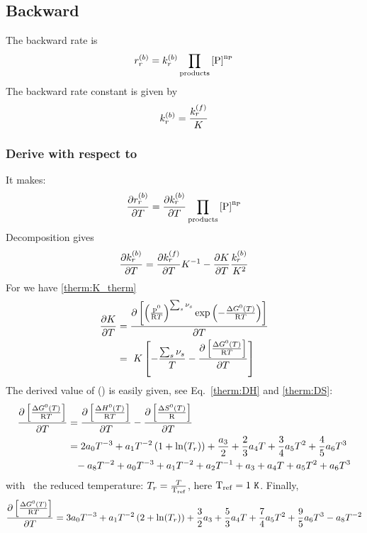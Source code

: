 \subsection{Backward}

The backward rate is
\begin{equation}
\bkwdrate[r] = \bkwdratecons[r]\prodProd
\end{equation}
The backward rate constant is given by
\begin{equation}
\bkwdratecons[r] = \frac{\fwdratecons[r]}{\Eqconst}
\end{equation}

\subsubsection{Derive with respect to \Temp}
It makes:
\begin{equation}
\doverdT{\bkwdrate[r]} = \doverdT{\bkwdratecons[r]}\prodProd
\end{equation}
Decomposition gives
\begin{equation}
\doverdT{\bkwdratecons[r]} = \doverdT{\fwdratecons[r]}\Eqconst^{-1} - \doverdT{\Eqconst}\frac{\bkwdratecons[r]}{\Eqconst^{2}}
\label{rateb-decomp}
\end{equation}
For \Eqconst we have \eqref{therm:K_therm}
\begin{equation}
\begin{split}
\doverdT{\Eqconst} & = \doverdT{\left[\left(\frac{\pz}{\Rg \Temp}\right)^{\sum_s \scoef[s]} \exp\left(-\frac{\DGibbsZ(\Temp)}{\Rg \Temp}\right)\right]} \\
                   & = \Eqconst\left[-\frac{\sum_s\scoef[s]}{\Temp} - \doverdT{\left[\frac{\DGibbsZ(\Temp)}{\Rg \Temp}\right]}\right]
\end{split}
\end{equation}
The derived value of \DGibbsZ(\Temp) is easily given, 
see Eq.~\ref{therm:DH} and \ref{therm:DS}:
\begin{equation}
\begin{split}
\doverdT{\left[\frac{\DGibbsZ(\Temp)}{\Rg \Temp}\right]} 
        & = \doverdT{\left[\frac{\DenthZ(T)}{\Rg \Temp}\right]} - \doverdT{\left[\frac{\DentrZ(\Temp)}{\Rg}\right]} \\
        & = 2\tc{0}\Temp^{-3} + \tc{1}\Temp^{-2}\left(1+\ln(\RedTemp)\right) + \frac{\tc{3}}{2} + 
           \frac{2}{3}\tc{4}\Temp + \frac{3}{4}\tc{5}\Temp^{2} + \frac{4}{5}\tc{6}\Temp^3 \\ 
        &  \spacehack - \tc{8}\Temp^{-2} + \tc{0}\Temp^{-3} + \tc{1}\Temp^{-2} + \tc{2}\Temp^{-1} + \tc{3} + \tc{4}\Temp + \tc{5} \Temp^{2} + \tc{6} \Temp^{3}
\end{split}
\end{equation}
with \RedTemp\ the reduced temperature: $\RedTemp = \frac{\Temp}{\Tref}$, here $\mathrm{T_{ref}} = 1~\mathtt{K}$.
Finally,
\begin{equation}
\doverdT{\left[\frac{\DGibbsZ(\Temp)}{\Rg \Temp}\right]} =
        3\tc{0}\Temp^{-3} + \tc{1} \Temp^{-2} \left(2 + \ln(\RedTemp)\right) + \frac{3}{2} \tc{3} + \frac{5}{3} \tc{4} \Temp
        + \frac{7}{4}\tc{5} \Temp^2 + \frac{9}{5}\tc{6} \Temp^3 - \tc{8} \Temp^{-2}
\end{equation}

